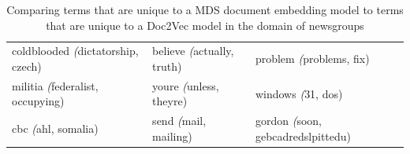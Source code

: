 \begin{table}[]
\begin{tabular}{lll}
		coldblooded \textit({dictatorship, czech)}      & believe \textit({actually, truth)}        & problem \textit({problems, fix)}                    \\
		militia \textit({federalist, occupying)}        & youre \textit({unless, theyre)}           & windows \textit({31, dos)}                          \\
		cbc \textit({ahl, somalia)}                     & send \textit({mail, mailing)}             & gordon \textit({soon, gebcadredslpittedu)}         
	\end{tabular}
	\caption{Comparing  terms that are unique to a MDS document embedding model to terms that are unique to a Doc2Vec model in the domain of newsgroups}\label{ch3:compared2vmds}
\end{table}





